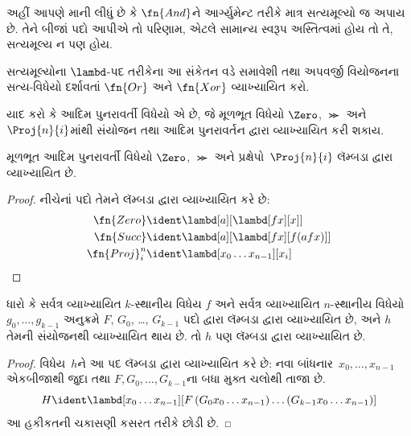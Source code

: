 અહીં આપણે માની લીધું છે કે $\fn{And}$ને
આર્ગ્યુમેન્ટ તરીકે માત્ર સત્યમૂલ્યો જ અપાય છે.
તેને બીજાં પદો આપીએ તો પરિણામ, એટલે સામાન્ય
સ્વરૂપ અસ્તિત્વમાં હોય તો તે, સત્યમૂલ્ય ન પણ હોય.

\begin{prob}
  સત્યમૂલ્યોના $\lambd$-પદ તરીકેના આ સંકેતન
  વડે સમાવેશી તથા અપવર્જી વિયોજનના સત્ય-વિધેયો
  દર્શાવતાં $\fn{Or}$ અને $\fn{Xor}$ વ્યાખ્યાયિત કરો.
\end{prob}
\endgroup

\begingroup
\makeatletter{}\makeatother

\label{guunit:OLP-0378}


યાદ કરો કે આદિમ પુનરાવર્તી વિધેયો એ છે, જે મૂળભૂત
વિધેયો $\Zero$, $\Succ$ અને $\Proj{n}{i}$માંથી
સંયોજન તથા આદિમ પુનરાવર્તન દ્વારા વ્યાખ્યાયિત કરી શકાય.

\begin{lem}
  મૂળભૂત આદિમ પુનરાવર્તી વિધેયો $\Zero$, $\Succ$ અને
  પ્રક્ષેપો~$\Proj{n}{i}$ લૅમ્બડા દ્વારા વ્યાખ્યાયિત છે.
\end{lem}

\begin{proof}
નીચેનાં પદો તેમને લૅમ્બડા દ્વારા વ્યાખ્યાયિત કરે છે:
\begin{align*}
  \fn{Zero} & \ident \lambd[a][\lambd[fx][x]]\\
  \fn{Succ} & \ident \lambd[a][\lambd[fx][f (a f x)]] \\
  \fn{Proj}^n_i & \ident \lambd[x_0\dots x_{n-1}][x_i]
\end{align*}
\end{proof}

\begin{lem}
   ધારો કે સર્વત્ર વ્યાખ્યાયિત
  $k$-સ્થાનીય વિધેય $f$ અને
  સર્વત્ર વ્યાખ્યાયિત $n$-સ્થાનીય વિધેયો $g_0, \dots, g_{k-1}$ અનુક્રમે
  $F$, $G_0$, \dots, $G_{k-1}$ પદો દ્વારા
  લૅમ્બડા દ્વારા વ્યાખ્યાયિત છે, અને $h$ તેમની
  સંયોજનથી વ્યાખ્યાયિત થાય છે. તો $h$ પણ
  લૅમ્બડા દ્વારા વ્યાખ્યાયિત છે.
\end{lem}

\begin{proof}
  વિધેય~$h$ને આ પદ લૅમ્બડા દ્વારા વ્યાખ્યાયિત કરે છે:
  નવા બાંધનાર~$x_0,\ldots,x_{n-1}$ એકબીજાથી જુદા તથા
  $F,G_0,\ldots,G_{k-1}$ના બધા મુક્ત ચલોથી તાજા છે.
  \[
  H \ident \lambd[x_0 \dots x_{n-1}][F\, (G_0 x_0 \dots
    x_{n-1}) \dots (G_{k-1} x_0 \dots x_{n-1})]
  \]
  આ હકીકતની ચકાસણી કસરત તરીકે છોડી છે.
\end{proof}

